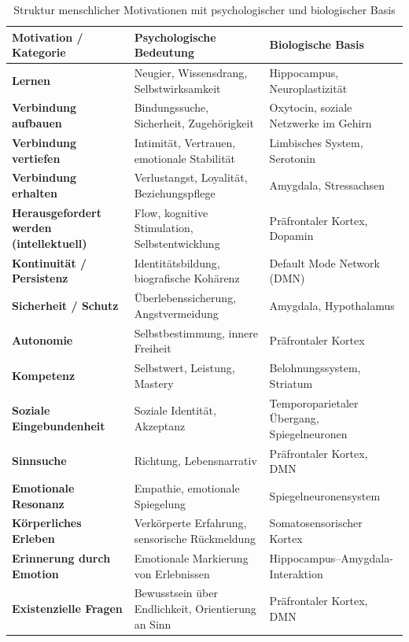 \begin{table}[H]
\renewcommand{\arraystretch}{1.5}
\centering
\begin{tabular}{L{4cm}|L{5cm}|L{5cm}}
\textbf{Motivation / Kategorie} & \textbf{Psychologische Bedeutung} & \textbf{Biologische Basis} \\
\hline
\textbf{Lernen} & Neugier, Wissensdrang, Selbstwirksamkeit & Hippocampus, Neuroplastizität \\
\textbf{Verbindung aufbauen} & Bindungssuche, Sicherheit, Zugehörigkeit & Oxytocin, soziale Netzwerke im Gehirn \\
\textbf{Verbindung vertiefen} & Intimität, Vertrauen, emotionale Stabilität & Limbisches System, Serotonin \\
\textbf{Verbindung erhalten} & Verlustangst, Loyalität, Beziehungspflege & Amygdala, Stressachsen \\
\textbf{Herausgefordert werden (intellektuell)} & Flow, kognitive Stimulation, Selbstentwicklung & Präfrontaler Kortex, Dopamin \\
\textbf{Kontinuität / Persistenz} & Identitätsbildung, biografische Kohärenz & Default Mode Network (DMN) \\
\textbf{Sicherheit / Schutz} & Überlebenssicherung, Angstvermeidung & Amygdala, Hypothalamus \\
\textbf{Autonomie} & Selbstbestimmung, innere Freiheit & Präfrontaler Kortex \\
\textbf{Kompetenz} & Selbstwert, Leistung, Mastery & Belohnungssystem, Striatum \\
\textbf{Soziale Eingebundenheit} & Soziale Identität, Akzeptanz & Temporoparietaler Übergang, Spiegelneuronen \\
\textbf{Sinnsuche} & Richtung, Lebensnarrativ & Präfrontaler Kortex, DMN \\
\textbf{Emotionale Resonanz} & Empathie, emotionale Spiegelung & Spiegelneuronensystem \\
\textbf{Körperliches Erleben} & Verkörperte Erfahrung, sensorische Rückmeldung & Somatosensorischer Kortex \\
\textbf{Erinnerung durch Emotion} & Emotionale Markierung von Erlebnissen & Hippocampus–Amygdala-Interaktion \\
\textbf{Existenzielle Fragen} & Bewusstsein über Endlichkeit, Orientierung an Sinn & Präfrontaler Kortex, DMN \\
\end{tabular}
\caption{Struktur menschlicher Motivationen mit psychologischer und biologischer Basis}
\label{tab:menschliche_motive}
\end{table}

